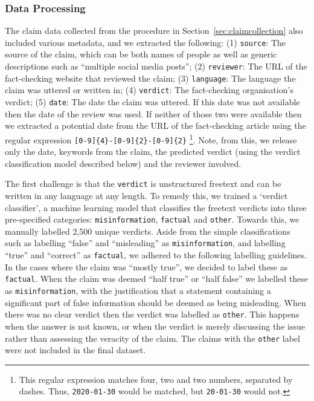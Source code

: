 \documentclass[sigconf,natbib=true,anonymous=false,nonacm]{acmart}
\begin{document}
\subsubsection{Data Processing}
\label{sec:claimdataprocessing}
The claim data collected from the procedure in
Section~\ref{sec:claimcollection} also included various metadata, and we
extracted the following: (1) \texttt{source}: The source of the claim, which
can be both names of people as well as generic descriptions such as ``multiple
social media posts''; (2) \texttt{reviewer}: The URL of the fact-checking
website that reviewed the claim; (3) \texttt{language}: The language the claim
was uttered or written in; (4) \texttt{verdict}: The fact-checking
organisation's verdict; (5) \texttt{date}: The date the claim was uttered. If
this date was not available then the date of the review was used. If neither of
those two were available then we extracted a potential date from the URL of the
fact-checking article using the regular expression
\texttt{[0-9]\{4\}-[0-9]\{2\}-[0-9]\{2\}} \footnote{This regular expression
matches four, two and two numbers, separated by dashes. Thus,
\texttt{2020-01-30} would be matched, but \texttt{20-01-30} would not.}.
Note, from this, we release only the date, keywords from the claim, the
predicted verdict (using the verdict classification model described below)
and the reviewer involved.

The first challenge is that the \texttt{verdict} is unstructured freetext and
can be written in any language at any length. To remedy this, we trained a
`verdict classifier', a machine learning model that classifies the freetext
verdicts into three pre-specified categories: \texttt{misinformation},
\texttt{factual} and \texttt{other}. Towards this, we manually labelled 2,500
unique verdicts. Aside from the simple classifications such as labelling
``false'' and ``misleading'' as \texttt{misinformation}, and labelling ``true''
and ``correct'' as \texttt{factual}, we adhered to the following labelling
guidelines. In the cases where the claim was ``mostly true'', we decided to
label these as \texttt{factual}. When the claim was deemed ``half true'' or
``half false'' we labelled these as \texttt{misinformation}, with the
justification that a statement containing a significant part of false
information should be deemed as being misleading. When there was no clear
verdict then the verdict was labelled as \texttt{other}. This happens when the
answer is not known, or when the verdict is merely discussing the issue rather
than assessing the veracity of the claim. The claims with the \texttt{other}
label were not included in the final dataset.
\end{document}
